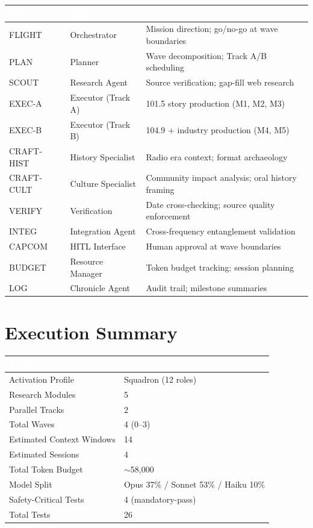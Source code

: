 \documentclass[11pt,letterpaper]{article}
\newcommand{\tableheader}[1]{\textbf{\sffamily\textcolor{white}{#1}}}
\begin{document}
\begin{center}
\begin{tabularx}{\textwidth}{L{2.2cm}L{2.5cm}X}
\toprule
{}
\tableheader{Role} & \tableheader{Agent} & \tableheader{Responsibility} \\
\midrule
FLIGHT & Orchestrator & Mission direction; go/no-go at wave boundaries \\
PLAN & Planner & Wave decomposition; Track A/B scheduling \\
SCOUT & Research Agent & Source verification; gap-fill web research \\
EXEC-A & Executor (Track A) & 101.5 story production (M1, M2, M3) \\
EXEC-B & Executor (Track B) & 104.9 + industry production (M4, M5) \\
CRAFT-HIST & History Specialist & Radio era context; format archaeology \\
CRAFT-CULT & Culture Specialist & Community impact analysis; oral history framing \\
VERIFY & Verification & Date cross-checking; source quality enforcement \\
INTEG & Integration Agent & Cross-frequency entanglement validation \\
CAPCOM & HITL Interface & Human approval at wave boundaries \\
BUDGET & Resource Manager & Token budget tracking; session planning \\
LOG & Chronicle Agent & Audit trail; milestone summaries \\
\bottomrule
\end{tabularx}
\end{center}

\section{Execution Summary}

\begin{center}
\begin{tabularx}{\textwidth}{L{5cm}X}
\toprule
{}
\tableheader{Metric} & \tableheader{Value} \\
\midrule
Activation Profile & Squadron (12 roles) \\
Research Modules & 5 \\
Parallel Tracks & 2 \\
Total Waves & 4 (0--3) \\
Estimated Context Windows & 14 \\
Estimated Sessions & 4 \\
Total Token Budget & $\sim$58,000 \\
Model Split & Opus 37\% / Sonnet 53\% / Haiku 10\% \\
Safety-Critical Tests & 4 (mandatory-pass) \\
Total Tests & 26 \\
\bottomrule
\end{tabularx}
\end{center}
\end{document}
